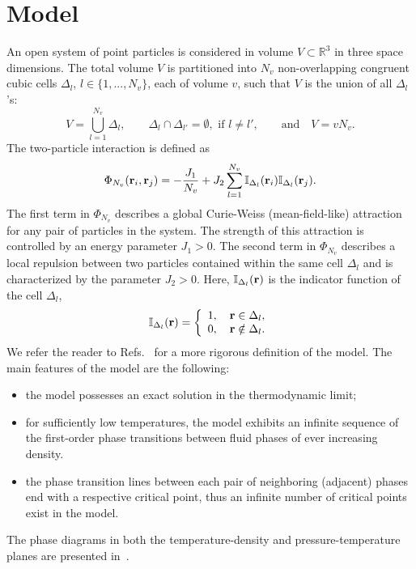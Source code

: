 \documentclass[entropy,article,submit,pdftex,moreauthors]{Definitions/mdpi}
\begin{document}
\section{Model}
\label{sec:model}
An open system of point particles is considered in volume $V\subset\mathbb R^3$ in three space dimensions. The total volume $V$ is partitioned into $N_v$ non-overlapping congruent cubic cells $\Delta_l$, $l\in\{1,...,N_v\}$, each of volume $v$, such that $V$ is the union of all $\Delta_l$'s:
\begin{equation}\label{volume}
	V = \bigcup_{l=1}^{N_v}\Delta_l,\qquad
	\Delta_l \cap \Delta_{l'} = \emptyset, \text{ if } l \neq l',\qquad\mbox{and}\quad
	V = v N_v.
\end{equation}
The two-particle interaction is defined as
\begin{equation}
	\label{def:curie-weiss-pot}
	\Phi_{N_v}(\vb{r}_i, \vb{r}_j) = -\frac{J_1}{N_v} + J_2\sum_{l=1}^{N_v} \mathbb{I}_{\Delta_l}(\vb{r}_i) \mathbb{I}_{\Delta_l}(\vb{r}_j).
\end{equation}
The first term in $\Phi_{N_v}$ describes a global Curie-Weiss (mean-field-like) attraction for any pair of particles in the system.
The strength of this attraction is controlled by an energy parameter $J_1 > 0$. The second term in $\Phi_{N_v}$ describes a local repulsion between two particles contained within the same cell $\Delta_l$ and is characterized by the parameter $J_2 > 0.$
Here, $\mathbb{I}_{\Delta_l}(\vb{r})$ is the indicator function of the cell $\Delta_l$,
\begin{equation}
	\label{def:I}
	\mathbb{I}_{\Delta_l} (\vb{r}) = \left\{
	\begin{array}{ll}
		1, \quad \vb{r} \in \Delta_l,
		\\
		0, \quad \vb{r} \notin \Delta_l.
	\end{array}
	\right.
\end{equation}
We refer the reader to Refs.~\citep{KKD20,KD22,RDKPS25arxiv} for a more rigorous definition of the model. The main features of the model are the following:
\begin{itemize}
	\item the model possesses an exact solution in the thermodynamic limit;
	
	\item for sufficiently low temperatures, the model exhibits an infinite sequence of the first-order phase transitions between fluid phases of ever increasing density.
	
	\item the phase transition lines between each pair of neighboring (adjacent) phases end with a respective critical point, thus an infinite number of critical points exist in the model.
	
\end{itemize}
The phase diagrams in both the temperature-density and pressure-temperature planes are presented in~\citep{KD22}.
\end{document}
